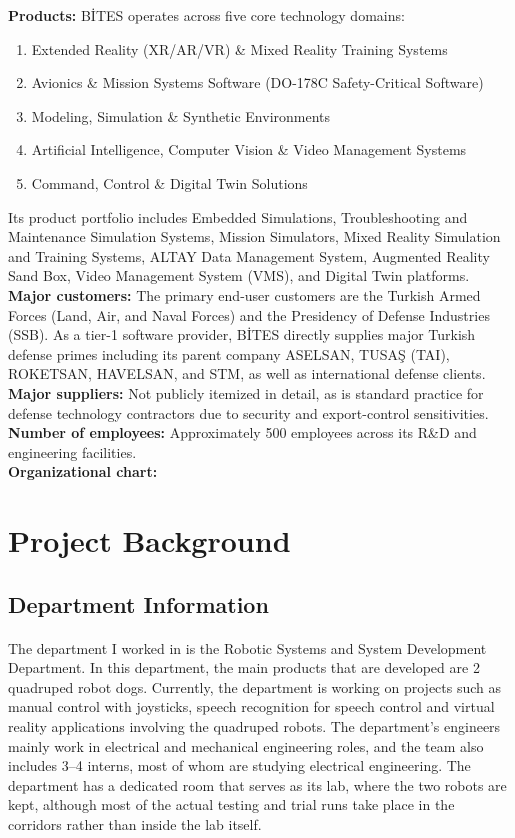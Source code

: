 \documentclass[12pt]{article}
\begin{document}
\textbf{Products:} BİTES operates across five core technology domains:
\begin{enumerate}
    \item Extended Reality (XR/AR/VR) \& Mixed Reality Training Systems
    \item Avionics \& Mission Systems Software (DO-178C Safety-Critical Software)
    \item Modeling, Simulation \& Synthetic Environments
    \item Artificial Intelligence, Computer Vision \& Video Management Systems
    \item Command, Control \& Digital Twin Solutions
\end{enumerate}
Its product portfolio includes Embedded Simulations, Troubleshooting and Maintenance Simulation Systems, Mission Simulators, Mixed Reality Simulation and Training Systems, ALTAY Data Management System, Augmented Reality Sand Box, Video Management System (VMS), and Digital Twin platforms.\\
\textbf{Major customers:} The primary end-user customers are the Turkish Armed Forces (Land, Air, and Naval Forces) and the Presidency of Defense Industries (SSB). As a tier-1 software provider, BİTES directly supplies major Turkish defense primes including its parent company ASELSAN, TUSAŞ (TAI), ROKETSAN, HAVELSAN, and STM, as well as international defense clients.\\
\textbf{Major suppliers:} Not publicly itemized in detail, as is standard practice for defense technology contractors due to security and export-control sensitivities.\\
\textbf{Number of employees:} Approximately 500 employees across its R\&D and engineering facilities.\\
\textbf{Organizational chart:}



\section{Project Background}
\label{sec:project-background}
\subsection{Department Information}
\label{subsec:department-info}
\paragraph{}The  department I worked in is the Robotic Systems and System Development Department. In this department, the  main products that are developed are 2 quadruped robot dogs. Currently, the department is working on projects such as manual control with joysticks, speech recognition for speech control and virtual reality applications involving the quadruped robots. The department's engineers mainly work in electrical and mechanical engineering roles, and the team also includes 3--4 interns, most of whom are studying electrical engineering. The department has a dedicated room that serves as its lab, where the two robots are kept, although most of the actual testing and trial runs take place in the corridors rather than inside the lab itself.
\end{document}
